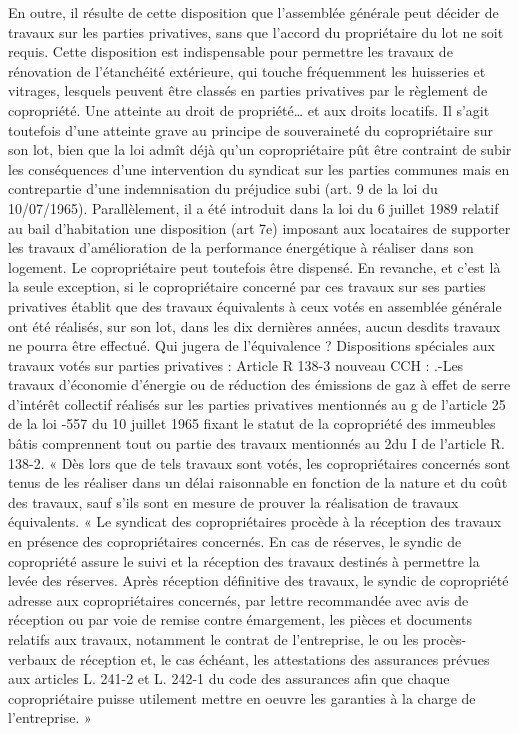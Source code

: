		En outre, il résulte de cette disposition que l’assemblée générale peut décider de travaux sur les parties privatives, sans que l'accord du propriétaire du lot ne soit requis. Cette disposition est indispensable pour permettre les travaux de rénovation de l'étanchéité extérieure, qui touche fréquemment les huisseries et vitrages, lesquels peuvent être classés en parties privatives par le règlement de copropriété.
		Une atteinte au droit de propriété… et aux droits locatifs.
		Il s'agit toutefois d'une atteinte grave au principe de souveraineté du copropriétaire sur son lot, bien que la loi admît déjà qu'un copropriétaire pût être contraint de subir les conséquences d'une intervention du syndicat sur les parties communes mais en contrepartie d'une indemnisation du préjudice subi (art. 9 de la loi du 10/07/1965).
		Parallèlement, il a été introduit dans la loi du 6 juillet 1989 relatif au bail d'habitation une disposition (art 7e) imposant aux locataires de supporter les travaux d'amélioration de la performance énergétique à réaliser dans son logement.
		Le copropriétaire peut toutefois être dispensé.
		En revanche, et c’est là la seule exception, si le copropriétaire concerné par ces travaux sur ses parties privatives établit que des travaux équivalents à ceux votés en assemblée générale ont été réalisés, sur son lot, dans les dix dernières années, aucun desdits travaux ne pourra être effectué.
		Qui jugera de l’équivalence ?
		Dispositions spéciales aux travaux votés sur parties privatives :
		Article R 138-3 nouveau CCH :
		.-Les travaux d'économie d'énergie ou de réduction des émissions de gaz à effet de serre d'intérêt collectif réalisés sur les parties privatives mentionnés au g de l'article 25 de la loi -557 du 10 juillet 1965 fixant le statut de la copropriété des immeubles bâtis comprennent tout ou partie des travaux mentionnés au 2\degres du I de l'article R. 138-2. « Dès lors que de tels travaux sont votés, les copropriétaires concernés sont tenus de les réaliser dans un délai raisonnable en fonction de la nature et du coût des travaux, sauf s'ils sont en mesure de prouver la réalisation de travaux équivalents. « Le syndicat des copropriétaires procède à la réception des travaux en présence des copropriétaires concernés. En cas de réserves, le syndic de copropriété assure le suivi et la réception des travaux destinés à permettre la levée des réserves. Après réception définitive des travaux, le syndic de copropriété adresse aux copropriétaires concernés, par lettre recommandée avec avis de réception ou par voie de remise contre émargement, les pièces et documents relatifs aux travaux, notamment le contrat de l'entreprise, le ou les procès-verbaux de réception et, le cas échéant, les attestations des assurances prévues aux articles L. 241-2 et L. 242-1 du code des assurances afin que chaque copropriétaire puisse utilement mettre en oeuvre les garanties à la charge de l'entreprise. »
